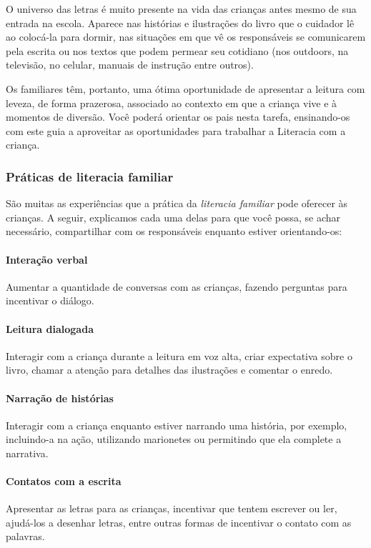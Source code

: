 \documentclass[11pt]{extarticle}
\begin{document}
O universo das letras é muito presente na vida das crianças antes mesmo de sua 
entrada na escola. Aparece nas histórias e ilustrações do livro que o cuidador 
lê ao colocá-la para dormir, nas situações em que vê os responsáveis se comunicarem 
pela escrita ou nos textos que podem permear seu cotidiano (nos outdoors, na 
televisão, no celular, manuais de instrução entre outros). 

Os familiares têm, 
portanto, uma ótima oportunidade de apresentar a leitura com leveza, de forma 
prazerosa, associado ao contexto em que a criança vive e à momentos de diversão. 
Você poderá orientar os pais nesta tarefa, ensinando-os com este guia a aproveitar 
as oportunidades para trabalhar a Literacia com a criança.


\subsubsection{Práticas de literacia familiar} 

São muitas as experiências que a prática da \textit{literacia familiar} 
pode oferecer às crianças. A seguir, explicamos cada uma delas para que você possa, 
se achar necessário, compartilhar com os responsáveis enquanto estiver orientando-os: 

\paragraph{Interação verbal} Aumentar a quantidade de conversas com as 
crianças, fazendo perguntas para incentivar o diálogo.

\paragraph{Leitura dialogada} Interagir com a criança durante a leitura 
em voz alta, criar expectativa sobre o livro, chamar a atenção para detalhes 
das ilustrações e comentar o enredo.

\paragraph{Narração de histórias} Interagir com a criança enquanto 
estiver narrando uma história, por exemplo, incluindo-a na ação, utilizando 
marionetes ou permitindo que ela complete a narrativa.

\paragraph{Contatos com a escrita} Apresentar as letras para as 
crianças, incentivar que tentem escrever ou ler, ajudá-los a desenhar letras, 
entre outras formas de incentivar o contato com as palavras.
\end{document}

